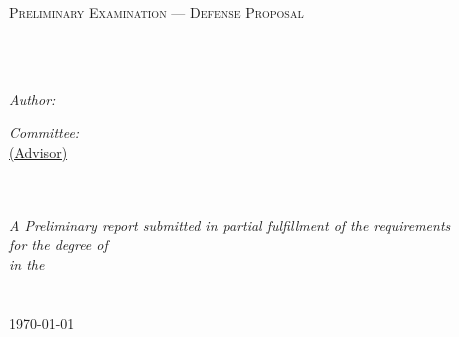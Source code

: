 \documentclass[
11pt, %
english, %
singlespacing, %
headsepline, %
]{main} %
\author{Avi \textsc{Srivastava}} %
\begin{document}
\frontmatter %

\pagestyle{plain} %


\begin{titlepage}
\begin{center}

{\scshape\LARGE \univname\par}\vspace{1.5cm} %
\textsc{\Large Preliminary Examination --- Defense Proposal}\\[0.5cm] %

\HRule \\[0.4cm] %
{\huge \bfseries \ttitle\par}\vspace{0.4cm} %
\HRule \\[1.5cm] %
 
\begin{minipage}[t]{0.4\textwidth}
\begin{flushleft} \large
\emph{Author:}\\
\href{http://k3yavi.github.io/}{\authorname} %
\end{flushleft}
\end{minipage}
\begin{minipage}[t]{0.4\textwidth}
\begin{flushright} \large
\emph{Committee:} \\
\href{http://www.robpatro.com/redesign/}{\supname  (Advisor)}\\ %
\href{http://www3.cs.stonybrook.edu/~bender/}{\examinerOname}\\
\href{https://www3.cs.stonybrook.edu/~skiena/}{\examinerThname}
\end{flushright}
\end{minipage}\\[3cm]
 
\large \textit{A Preliminary report submitted in partial fulfillment of the requirements\\ for the degree of \degreename}\\[0.3cm] %
\textit{in the}\\[0.4cm]
\groupname\\\deptname\\[2cm] %
 
{\large \today}\\[4cm] %
 
\vfill
\end{center}
\end{titlepage}
\end{document}
